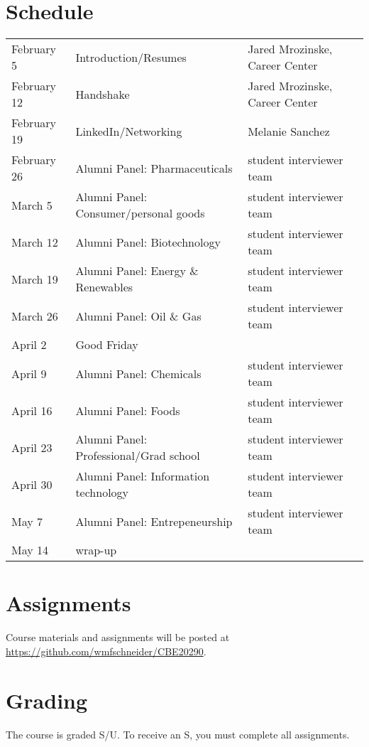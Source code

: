 \documentclass[11pt]{article}
\begin{document}
\section{Schedule}
\label{sec:org2b712e7}
\begin{center}
\begin{tabular}{lll}
February 5 & Introduction/Resumes & Jared Mrozinske, Career Center\\
February 12 & Handshake & Jared Mrozinske, Career Center\\
February 19 & LinkedIn/Networking & Melanie Sanchez\\
February 26 & Alumni Panel: Pharmaceuticals & student interviewer team\\
March 5 & Alumni Panel: Consumer/personal goods & student interviewer team\\
March 12 & Alumni Panel: Biotechnology & student interviewer team\\
March 19 & Alumni Panel: Energy \& Renewables & student interviewer team\\
March 26 & Alumni Panel: Oil \& Gas & student interviewer team\\
April 2 & Good Friday & \\
April 9 & Alumni Panel: Chemicals & student interviewer team\\
April 16 & Alumni Panel: Foods & student interviewer team\\
April 23 & Alumni Panel: Professional/Grad school & student interviewer team\\
April 30 & Alumni Panel: Information technology & student interviewer team\\
May 7 & Alumni Panel: Entrepeneurship & student interviewer team\\
May 14 & wrap-up & \\
\end{tabular}
\end{center}

\section{Assignments}
\label{sec:org2ba5d5a}
Course materials and assignments will be posted at  \url{https://github.com/wmfschneider/CBE20290}.

\section{Grading}
\label{sec:org30a0438}
The course is graded S/U. To receive an S, you must complete all assignments.
\end{document}
